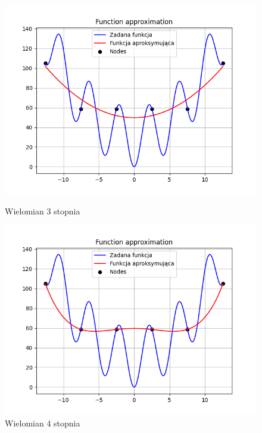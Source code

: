 \documentclass{article}
\begin{document}
\begin{figure}[H]
  \begin{minipage}[b]{0.49\textwidth}
    \begin{minipage}[b]{\textwidth}
      \includegraphics[width=\textwidth]{img01.png}
      \caption{Wielomian 3 stopnia}
    \end{minipage}
    \vspace*{\fill}
    \begin{minipage}[b]{\textwidth}
      \includegraphics[width=\textwidth]{img02.png}
      \caption{Wielomian 4 stopnia}
    \end{minipage}
  \end{minipage}
  \hfill
  \begin{minipage}[b]{0.49\textwidth}

\end{minipage}
\end{figure}
\end{document}
